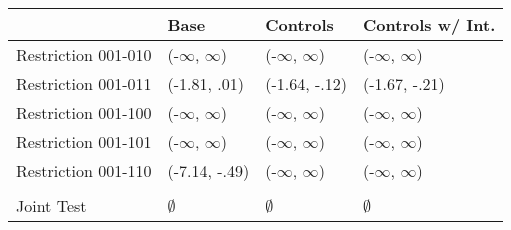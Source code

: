 \begin{tabular}{llll}
\toprule
{} &           Base &       Controls & Controls w/ Int. \\
\midrule
Restriction 001-010 &      (-$\infty$, $\infty$) &      (-$\infty$, $\infty$) &        (-$\infty$, $\infty$) \\
Restriction 001-011 &   (-1.81, .01) &  (-1.64, -.12) &    (-1.67, -.21) \\
Restriction 001-100 &      (-$\infty$, $\infty$) &      (-$\infty$, $\infty$) &        (-$\infty$, $\infty$) \\
Restriction 001-101 &      (-$\infty$, $\infty$) &      (-$\infty$, $\infty$) &        (-$\infty$, $\infty$) \\
Restriction 001-110 &  (-7.14, -.49) &      (-$\infty$, $\infty$) &        (-$\infty$, $\infty$) \\
\hline\\Joint Test  &         $\emptyset$ &         $\emptyset$ &           $\emptyset$ \\
\bottomrule
\end{tabular}
